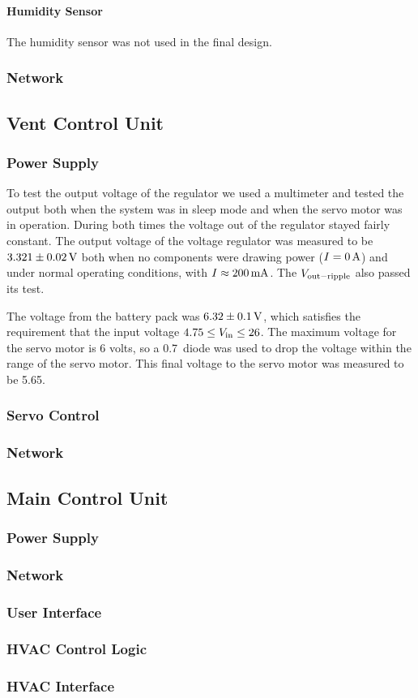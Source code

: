 \paragraph{Humidity Sensor}
The humidity sensor was not used in the final design.

\subsubsection{Network}

\subsection{Vent Control Unit}
\subsubsection{Power Supply}
To test the output voltage of the regulator we used a multimeter and tested the output both when the system was in sleep mode and when the servo motor was in operation. During both times the voltage out of the regulator stayed fairly constant. The output voltage of the voltage regulator was measured to be $3.321 \pm 0.02\mbox{\,V}$ both when no components were drawing power ($I=0\mbox{\,A}$) and under normal operating conditions, with $I\approx200\mbox{\,mA}$. The $V_{\rm out-ripple}$ also passed its test.

The voltage from the battery pack was $6.32 \pm 0.1 \mbox{\,V}$, which satisfies the requirement that the input voltage $4.75 \leq V_{\rm in} \leq 26$. The maximum voltage for the servo motor is 6 volts, so a 0.7\volts\ diode was used to drop the voltage within the range of the servo motor. This final voltage to the servo motor was measured to be 5.65\volts .

\subsubsection{Servo Control}

\subsubsection{Network}

\subsection{Main Control Unit}

\subsubsection{Power Supply}

\subsubsection{Network}

\subsubsection{User Interface}

\subsubsection{HVAC Control Logic}

\subsubsection{HVAC Interface}


